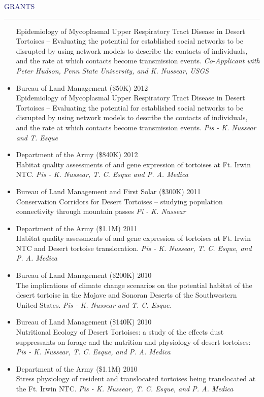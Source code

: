 \documentclass{resume} %
\renewenvironment{rSection}[1]{
\sectionskip
\textcolor{MidnightBlue}{\MakeUppercase{#1}}
\sectionlineskip
\hrule
\begin{list}{}{
\setlength{\leftmargin}{1.5em}
}
\item[]
}{
\end{list}
}
\begin{document}
\begin{rSection}{Grants}{}
\begin{itemize}
Epidemiology of Mycoplasmal Upper Respiratory Tract Disease in Desert Tortoises – Evaluating the potential for established social networks to be disrupted by using network models to describe the contacts of individuals, and the rate at which contacts become transmission events. \textit{Co-Applicant with Peter Hudson, Penn State University, and K. Nussear, USGS}
\item Bureau of Land Management (\$50K) \hfill 2012 \\ 
Epidemiology of Mycoplasmal Upper Respiratory Tract Disease in Desert Tortoises – Evaluating the potential for established social networks to be disrupted by using network models to describe the contacts of individuals, and the rate at which contacts become transmission events. \textit{Pis - K. Nussear and T. Esque}
\item Department of the Army (\$840K)  \hfill 2012 \\ Habitat quality assessments of and gene expression of tortoises at Ft. Irwin NTC. \textit{Pis - K. Nussear, T. C. Esque and P. A. Medica}
\item Bureau of Land Management and First Solar (\$300K) \hfill 2011 \\ 
Conservation Corridors for Desert Tortoises – studying population connectivity through mountain passes \textit{Pi - K. Nussear}
\item Department of the Army (\$1.1M) \hfill 2011 \\ 
Habitat quality assessments of and gene expression of tortoises at Ft. Irwin NTC and Desert tortoise translocation. \textit{Pis - K. Nussear, T. C. Esque, and P. A. Medica}
\item Bureau of Land Management (\$200K) \hfill 2010 \\ 
The implications of climate change scenarios on the potential habitat of the desert tortoise in the Mojave and Sonoran Deserts of the Southwestern United States. \textit{Pis - K. Nussear and T. C. Esque}.
\item Bureau of Land Management (\$140K) \hfill 2010 \\ 
Nutritional Ecology of Desert Tortoises: a study of the effects dust suppressants on forage and the nutrition and physiology of desert tortoises: \textit{Pis - K. Nussear, T. C. Esque, and P. A. Medica}
\item Department of the Army (\$1.1M) \hfill 2010 \\ 
Stress physiology of resident and translocated tortoises being translocated at the Ft. Irwin NTC. \textit{Pis - K. Nussear, T. C. Esque, and P. A. Medica}

\end{itemize}
\end{rSection}
\end{document}
